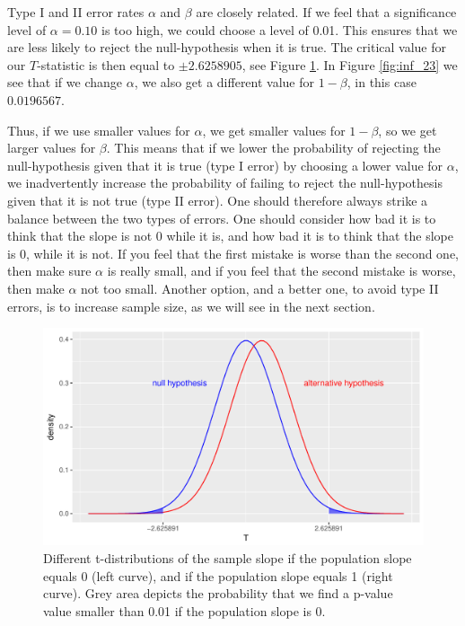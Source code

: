 \documentclass[]{report}\usepackage[]{graphicx}\usepackage[]{color}
\makeatletter
\def\maxwidth{ %
  \ifdim\Gin@nat@width>\linewidth
    \linewidth
  \else
    \Gin@nat@width
  \fi
}
\newenvironment{knitrout}{}{} %
\makeatother
\begin{document}
Type I and II error rates $\alpha$ and $\beta$ are closely related. If we feel that a significance level of $\alpha=0.10$ is too high, we could choose a level of 0.01. This ensures that we are less likely to reject the null-hypothesis when it is true. The critical value for our $T$-statistic is then equal to $\pm  2.6258905$, see Figure \ref{fig:inf_22}. In Figure \ref{fig:inf_23} we see that if we change $\alpha$, we also get a different value for $1-\beta$, in this case $0.0196567$.

Thus, if we use smaller values for $\alpha$, we get smaller values for $1-\beta$, so we get larger values for $\beta$. This means that if we lower the probability of rejecting the null-hypothesis given that it is true (type I error) by choosing a lower value for $\alpha$, we inadvertently increase the probability of failing to reject the null-hypothesis given that it is not true (type II error). One should therefore always strike a balance between the two types of errors. One should consider how bad it is to think that the slope is not 0 while it is, and how bad it is to think that the slope is 0, while it is not. If you feel that the first mistake is worse than the second one, then make sure $\alpha$ is really small, and if you feel that the second mistake is worse, then make $\alpha$ not too small. Another option, and a better one, to avoid type II errors, is to increase sample size, as we will see in the next section.

\begin{knitrout}
\color{fgcolor}\begin{figure}

{\centering \includegraphics[width=\maxwidth]{figure/inf_22-1} 

}

\caption[Different t-distributions of the sample slope if the population slope equals 0 (left curve), and if the population slope equals 1 (right curve)]{Different t-distributions of the sample slope if the population slope equals 0 (left curve), and if the population slope equals 1 (right curve). Grey area depicts the probability that we find a p-value value smaller than 0.01 if the population slope is 0.}\label{fig:inf_22}
\end{figure}


\end{knitrout}
\end{document}
